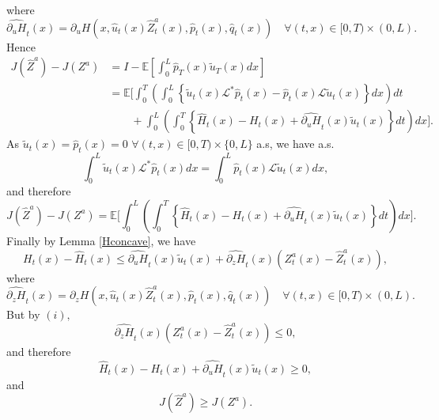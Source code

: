 \documentclass[11pt]{article}
\begin{document}
where
$$\widehat{\partial_u H}_t(x) = \partial_u H \left(x, \hat u_t(x) \hat Z^a_t(x), \hat p_t(x), \hat q_t(x) \right) \quad \forall (t,x) \in [0,T) \times (0,L).$$
Hence 
\begin{align*}
J(\hat Z^a) - J(Z^a)& = I - \mathbb E\left[\int_0^L \hat p_T(x)\tilde u_T(x) dx   \right] \\
&= \mathbb E \Bigg[ \int_0^T\left( \int_0^L \left\{ \tilde u_t(x) \mathcal L^* \hat p_t(x) - \hat p_t(x) \mathcal L \tilde u_t(x) \right\} dx\right)dt\\
& \qquad + \int_0^L \left( \int_0^T \left\{ \hat H_t(x) - H_t(x) + \widehat{\partial_u H}_t(x) \tilde u_t(x) \right\} dt \right) dx  \Bigg].
\end{align*}
As $\tilde u_t(x) = \hat p_t(x) = 0 $ $ \forall (t,x) \in [0,T) \times \{0,L\}$ a.s, we have a.s. 
$$\int_0^L  \tilde u_t(x) \mathcal L^* \hat p_t(x)    dx = \int_0^L \hat p_t(x) \mathcal L \tilde u_t(x) dx, $$
and therefore
$$J(\hat Z^a) - J(Z^a) = \mathbb E \Bigg[ \int_0^L \left( \int_0^T \left\{ \hat H_t(x) - H_t(x) + \widehat{\partial_u H}_t(x) \tilde u_t(x) \right\} dt \right) dx  \Bigg].$$
Finally by Lemma \ref{Hconcave}, we have
$$H_t(x) - \hat H_t(x) \le \widehat{\partial_u H}_t(x) \tilde u_t(x) + \widehat{\partial_z H}_t(x) \left(Z^a_t(x) - \hat Z^a_t(x) \right),$$
where
$$\widehat{\partial_z H}_t(x) = \partial_z H \left(x, \hat u_t(x) \hat Z^a_t(x), \hat p_t(x), \hat q_t(x) \right) \quad \forall (t,x) \in [0,T) \times (0,L).$$
But by $(i),$ 
$$\widehat{\partial_z H}_t(x) \left(Z^a_t(x) - \hat Z^a_t(x) \right) \le 0,$$
and therefore
$$\hat H_t(x) - H_t(x) + \widehat{\partial_u H}_t(x) \tilde u_t(x) \ge 0,$$
and
$$J(\hat Z^a) \ge J(Z^a).$$




\end{document}
